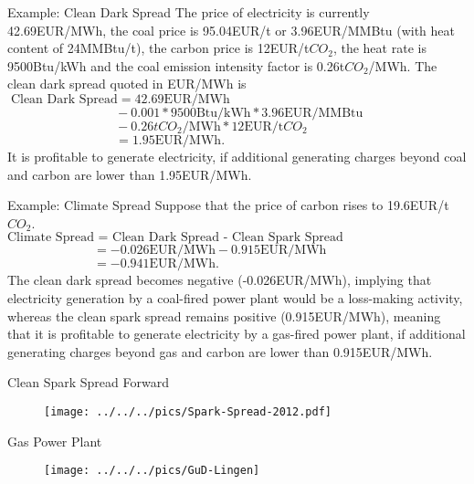 {Example: Clean Dark Spread}
The price of electricity is currently 42.69EUR/MWh, the coal price is 95.04EUR/t or 3.96EUR/MMBtu (with heat content of 24MMBtu/t), the carbon price is 12EUR/t$CO_2$, the heat rate is 9500Btu/kWh and the coal emission intensity factor is 0.26t$CO_2$/MWh. The clean dark spread quoted in EUR/MWh is\\
$\;\text{Clean Dark Spread}=42.69\text{EUR/MWh}$\\
$\qquad\qquad\qquad\qquad\;\,-0.001\ast9500\text{Btu/kWh}\ast3.96\text{EUR/MMBtu}$\\
$\qquad\qquad\qquad\qquad\;\,-0.26tCO_2\text{/MWh}\ast12\text{EUR/t}CO_2$\\
$\qquad\qquad\qquad\qquad\;\,=1.95\text{EUR/MWh}.$\\
\vspace{0.2cm}
It is profitable to generate electricity, if additional generating charges beyond coal and carbon are lower than 1.95EUR/MWh.




{Example: Climate Spread}
Suppose that the price of carbon rises to 19.6EUR/t$CO_2$.\\
\vspace{0.25cm}
$\text{Climate Spread = Clean Dark Spread - Clean Spark Spread}$\\
$\qquad\qquad\qquad\;\;\,=-0.026\text{EUR/MWh}-0.915\text{EUR/MWh}$\\
$\qquad\qquad\qquad\;\;\,=-0.941\text{EUR/MWh}.$\\
\vspace{0.25cm}
The clean dark spread becomes negative (-0.026EUR/MWh), implying that electricity generation by a coal-fired power plant would be a loss-making activity, whereas the clean spark spread remains positive (0.915EUR/MWh), meaning that it is profitable to generate electricity by a gas-fired power plant, if additional generating charges beyond gas and carbon are lower than 0.915EUR/MWh.



{Clean Spark Spread Forward}
\begin{figure}[htp]
\centering
\texttt{[image: ../../../pics/Spark-Spread-2012.pdf]}
\end{figure}




{Gas Power Plant}
\begin{figure}[htp]
\centering
\texttt{[image: ../../../pics/GuD-Lingen]}
\label{prices}
\end{figure}



